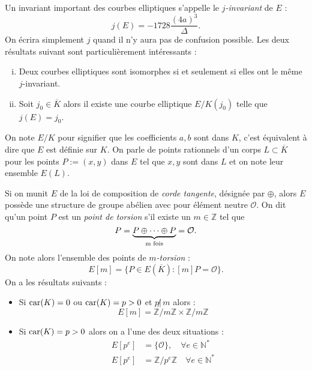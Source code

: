 \documentclass[a4paper]{article} %
\numberwithin{section}{part}
\numberwithin{equation}{section}
\newcommand\zmodn[1]{\mathbb{Z}/#1\mathbb{Z}}
\newcommand\ZZ{\mathbb{Z}}
\newcommand\NN{\mathbb{N}}
\newcommand\EO{\mathcal{O}}
\begin{document}
Un invariant important des courbes elliptiques s'appelle le \emph{$j$-invariant}
de $E$ :
\begin{equation}
j(E) = -1728\dfrac{(4a)^3}{\Delta}.
\end{equation}
On écrira simplement $j$ quand il n'y aura pas de confusion possible. Les deux
résultats suivant sont particulièrement intéressants :
\begin{prop}
\label{prop:j-invariant}
\begin{enumerate}[(i)]
    \item Deux courbes elliptiques sont isomorphes si et seulement si elles ont
    le même $j$-invariant.
    \item Soit $j_0\in\overline{K}$ alors il existe une courbe elliptique
    $E/K(j_0)$ telle que $j(E) = j_0$.
\end{enumerate}
\end{prop}
On note $E/K$ pour signifier que les coefficients $a, b$ sont dans $K$, c'est
équivalent à dire que $E$ est définie sur $K$. On parle de points rationnels 
d'un corps $L\subset\overline{K}$ pour les points
$P := (x,y)$ dans $E$ tel que $x, y$ sont dans $L$ et on note leur ensemble
$E(L)$.\par
\vspace{0.3cm}
Si on munit $E$ de la loi de composition de \emph{corde tangente}, désignée par
$\oplus$, alors $E$ possède une structure de groupe abélien avec pour élément 
neutre $\EO$. On dit qu'un point $P$ est un \emph{point de torsion} s'il existe 
un $m\in\ZZ$ tel que 
\begin{equation}
[m]P = \underbrace{P\oplus\dots\oplus P}_{\textup{m fois}} = \EO.
\end{equation}
On note alors l'ensemble des points de \emph{$m$-torsion} :
\begin{equation}
E[m] = \lbrace{P\in E(\overline{K}) : [m]P = \EO}\rbrace.
\end{equation}
On a les résultats suivants :
\vspace{0.3cm}
\begin{itemize}
\item Si $\textup{car}(K) = 0$ ou $\textup{car}(K) = p > 0$ et $p\not|\,m$ 
alors :
\begin{equation}
E[m] = \zmodn{m}\times\zmodn{m}
\end{equation}
\item Si $\textup{car}(K) = p > 0$ alors on a l'une des deux situations :
    \begin{align} 
    E[p^e] &= \lbrace{\EO}\rbrace, \quad \forall e\in\NN^{*}\\
    E[p^e] &= \zmodn{p^e}\quad \forall e\in\NN^{*}
    \end{align}
\end{itemize}
\vspace{0.3cm}
\end{document}
